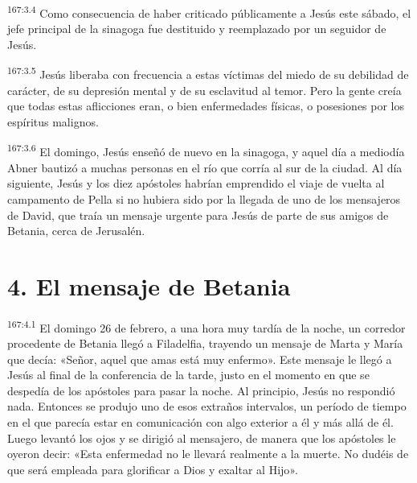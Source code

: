 \par 
\textsuperscript{167:3.4} Como consecuencia de haber criticado públicamente a Jesús este sábado, el jefe principal de la sinagoga fue destituido y reemplazado por un seguidor de Jesús.

\par 
\textsuperscript{167:3.5} Jesús liberaba con frecuencia a estas víctimas del miedo de su debilidad de carácter, de su depresión mental y de su esclavitud al temor. Pero la gente creía que todas estas aflicciones eran, o bien enfermedades físicas, o posesiones por los espíritus malignos.

\par 
\textsuperscript{167:3.6} El domingo, Jesús enseñó de nuevo en la sinagoga, y aquel día a mediodía Abner bautizó a muchas personas en el río que corría al sur de la ciudad. Al día siguiente, Jesús y los diez apóstoles habrían emprendido el viaje de vuelta al campamento de Pella si no hubiera sido por la llegada de uno de los mensajeros de David, que traía un mensaje urgente para Jesús de parte de sus amigos de Betania, cerca de Jerusalén.

\section*{4. El mensaje de Betania}
\par 
\textsuperscript{167:4.1} El domingo 26 de febrero, a una hora muy tardía de la noche, un corredor procedente de Betania llegó a Filadelfia, trayendo un mensaje de Marta y María que decía: «Señor, aquel que amas está muy enfermo». Este mensaje le llegó a Jesús al final de la conferencia de la tarde, justo en el momento en que se despedía de los apóstoles para pasar la noche. Al principio, Jesús no respondió nada. Entonces se produjo uno de esos extraños intervalos, un período de tiempo en el que parecía estar en comunicación con algo exterior a él y más allá de él. Luego levantó los ojos y se dirigió al mensajero, de manera que los apóstoles le oyeron decir: «Esta enfermedad no le llevará realmente a la muerte. No dudéis de que será empleada para glorificar a Dios y exaltar al Hijo».

